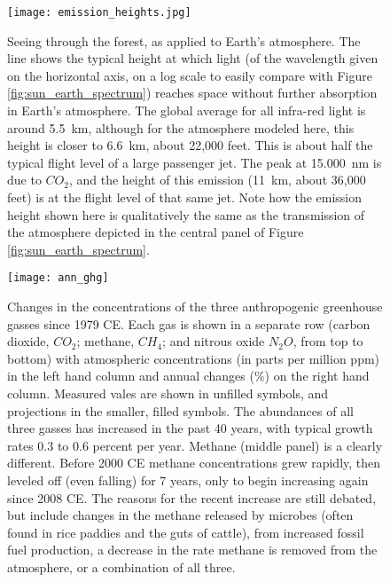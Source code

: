 \documentclass[amstex,12pt]{book}
\begin{document}
\begin{figure}[p]
\centering
\texttt{[image: emission\_heights.jpg]}%
\caption{Seeing through the forest, as applied to Earth's atmosphere. The line shows the typical height at which light (of the wavelength given on the horizontal axis, on a log scale to easily compare with Figure \ref{fig:sun_earth_spectrum}) reaches space without further absorption in Earth's atmosphere. The global average for all infra-red light is around \SI{5.5}{\kilo\metre}, although for the atmosphere modeled here, this height is closer to \SI{6.6}{\kilo\metre}, about 22,000 feet. This is about half the typical flight level of a large passenger jet. The peak at \SI{15,000}{\nano\metre} is due to $CO_2$, and the height of this emission (\SI{11}{\kilo\metre}, about 36,000 feet) is at the flight level of that same jet. Note how the emission height shown here is qualitatively the same as the transmission of the atmosphere depicted in the central panel of Figure \ref{fig:sun_earth_spectrum}.}   
\label{fig:emission_heights}
\end{figure}

\newpage
\begin{sidewaysfigure}
\centering
\texttt{[image: ann\_ghg]}%
\caption{Changes in the concentrations of the three anthropogenic greenhouse gasses since 1979 CE. Each gas is shown in a separate row (carbon dioxide, $CO_2$; methane, $CH_4$; and nitrous oxide $N_2O$, from top to bottom) with atmospheric concentrations (in parts per million ppm) in the left hand column and annual changes (\%) on the right hand column. Measured vales are shown in unfilled symbols, and projections in the smaller, filled symbols. The abundances of all three gasses has increased in the past 40 years, with typical growth rates 0.3 to 0.6 percent per year. Methane (middle panel) is a clearly different. Before 2000 CE methane concentrations grew rapidly, then leveled off (even falling) for 7 years, only to begin increasing again since 2008 CE. The reasons for the recent increase are still debated, but include changes in the methane released by microbes (often found in rice paddies and the guts of cattle), from increased fossil fuel production, a decrease in the rate methane is removed from the atmosphere, or a combination of all three. }
\label{fig:annghg}
\end{sidewaysfigure}
\end{document}

